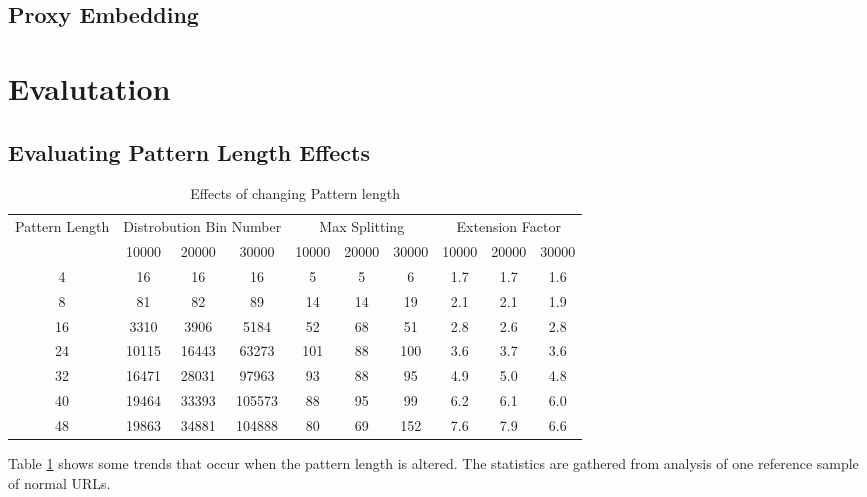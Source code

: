 \documentclass[10pt,a4paper]{article}
\begin{document}
\subsection{Proxy Embedding}

\pagebreak
\section{Evalutation}

\subsection{Evaluating Pattern Length Effects}\label{sec:gran}

\begin{table}[h]
\centering
\begin{tabular}{|c|c|c|c|c|c|c|c|c|c|}
\hline
\multirow{2}{*}{Pattern Length}&
\multicolumn{3}{|c|}{Distrobution Bin Number}&
\multicolumn{3}{|c|}{Max Splitting}&
\multicolumn{3}{|c|}{Extension Factor}\\
\cline{2-10}
&10000&20000&30000&10000&20000&30000&10000&20000&30000\\
\hline
4 	& 16&16&16 				& 5&5&6 		& 1.7&1.7&1.6\\
8 	& 81&82&89 				& 14&14&19		& 2.1&2.1&1.9\\
16 	& 3310&3906&5184 		& 52&68&51 		& 2.8&2.6&2.8\\
24 	& 10115&16443&63273 	& 101&88&100 	& 3.6&3.7&3.6\\
32 	& 16471&28031&97963 	& 93&88&95 		& 4.9&5.0&4.8\\
40 	& 19464&33393&105573 	& 88&95&99 		& 6.2&6.1&6.0\\
48 	& 19863&34881&104888 	& 80&69&152 	& 7.6&7.9&6.6\\
\hline
\end{tabular}
\caption{Effects of changing Pattern length}
\label{tab:patlen}
\end{table}

Table \ref{tab:patlen} shows some trends that occur when the pattern length is altered. The statistics are gathered from analysis of one reference sample of normal URLs.
\end{document}
